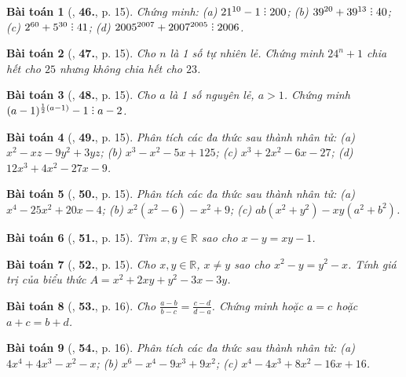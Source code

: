 \documentclass{article}
\numberwithin{equation}{section}
\newtheorem{baitoan}{Bài toán}
\DeclareRobustCommand{\divby}{%
	\mathrel{\vbox{\baselineskip.65ex\lineskiplimit0pt\hbox{.}\hbox{.}\hbox{.}}}%
}
\begin{document}
\begin{baitoan}[\cite{Tuyen_Toan_8}, \textbf{46.}, p. 15]
	Chứng minh: (a) $21^{10} - 1\divby200$; (b) $39^{20} + 39^{13}\divby40$; (c) $2^{60} + 5^{30}\divby41$; (d) $2005^{2007} + 2007^{2005}\divby2006$.
\end{baitoan}

\begin{baitoan}[\cite{Tuyen_Toan_8}, \textbf{47.}, p. 15]
	Cho $n$ là 1 số tự nhiên lẻ. Chứng minh $24^n + 1$ chia hết cho $25$ nhưng không chia hết cho $23$.
\end{baitoan}

\begin{baitoan}[\cite{Tuyen_Toan_8}, \textbf{48.}, p. 15]
	Cho $a$ là 1 số nguyên lẻ, $a > 1$. Chứng minh $(a - 1)^{\frac{1}{2}(a - 1)} - 1\divby a - 2$.
\end{baitoan}

\begin{baitoan}[\cite{Tuyen_Toan_8}, \textbf{49.}, p. 15]
	Phân tích các đa thức sau thành nhân tử: (a) $x^2 - xz - 9y^2 + 3yz$; (b) $x^3 - x^2 - 5x + 125$; (c) $x^3 + 2x^2 - 6x - 27$; (d) $12x^3 + 4x^2 - 27x - 9$.
\end{baitoan}

\begin{baitoan}[\cite{Tuyen_Toan_8}, \textbf{50.}, p. 15]
	Phân tích các đa thức sau thành nhân tử: (a) $x^4 - 25x^2 + 20x - 4$; (b) $x^2(x^2 - 6) - x^2 + 9$; (c) $ab(x^2 + y^2) - xy(a^2 + b^2)$.
\end{baitoan}

\begin{baitoan}[\cite{Tuyen_Toan_8}, \textbf{51.}, p. 15]
	Tìm $x,y\in\mathbb{R}$ sao cho $x - y = xy - 1$.
\end{baitoan}

\begin{baitoan}[\cite{Tuyen_Toan_8}, \textbf{52.}, p. 15]
	Cho $x,y\in\mathbb{R}$, $x\ne y$ sao cho $x^2 - y = y^2 - x$. Tính giá trị của biểu thức $A = x^2 + 2xy + y^2 - 3x - 3y$.
\end{baitoan}

\begin{baitoan}[\cite{Tuyen_Toan_8}, \textbf{53.}, p. 16]
	Cho $\frac{a - b}{b - c} = \frac{c - d}{d - a}$. Chứng minh hoặc $a = c$ hoặc $a + c = b + d$.
\end{baitoan}

\begin{baitoan}[\cite{Tuyen_Toan_8}, \textbf{54.}, p. 16]
	Phân tích các đa thức sau thành nhân tử: (a) $4x^4 + 4x^3 - x^2 - x$; (b) $x^6 - x^4 - 9x^3 + 9x^2$; (c) $x^4 - 4x^3 + 8x^2 - 16x + 16$.
\end{baitoan}
\end{document}
